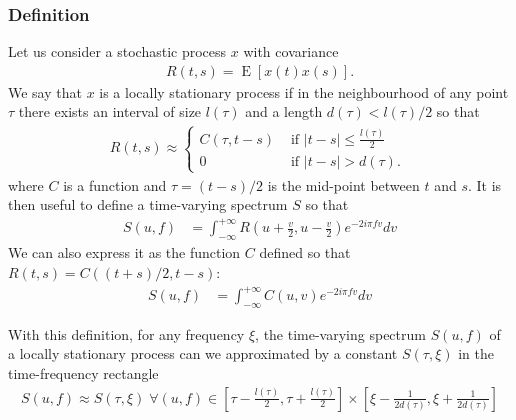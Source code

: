\documentclass{article}
\begin{document}
\subsubsection{Definition}
Let us consider a stochastic process $x$ with covariance 
\begin{eqnarray}
    R(t, s) = \operatorname{E}\left[x(t) x(s)\right].
\end{eqnarray}
We say that $x$ is a locally stationary process if in the neighbourhood of any point $\tau$ there exists an interval of size $l(\tau)$ and a length $d(\tau) < l(\tau)/2$ so that
\begin{align}
\label{eq:locally-stationary}
R(t, s)  \approx \left\{
\begin{array}{lr}
C(\tau, t-s) & \text { if }|t-s| \leq \frac{l(\tau)}{2}\\
0 & \text { if }|t-s| > d(\tau).
\end{array}\right.\;
\end{align}
where $C$ is a function and $\tau = (t-s) / 2$ is the mid-point between $t$ and $s$.
It is then useful to define a time-varying spectrum $S$ so that
\begin{align}
\label{eq:def-evolutionary-spectrum}
S(u, f) & = \int_{-\infty}^{+\infty} R\left(u+\frac{v}{2}, u-\frac{v}{2}\right) e^{-2 i \pi f  v} d v
\end{align}
We can also express it as the function $C$ defined so that $R(t, s) = C((t+s)/2, t-s)$:
\begin{align}
\label{eq:def-evolutionary-spectrum-2}
S(u, f) & = \int_{-\infty}^{+\infty} C(u, v) e^{-2 i \pi f  v} d v
\end{align}


With this definition, for any frequency $\xi$, the time-varying spectrum $S(u, f)$ of a locally stationary process can we approximated by a constant $S(\tau, \xi)$ in the time-frequency rectangle
\begin{eqnarray}
\label{eq:constant_spectrum_approx}
S(u, f) \approx S(\tau, \xi) \; \forall 
   (u, f) \in\left[\tau-\frac{l(\tau)}{2}, \tau+\frac{l(\tau)}{2}\right] \times\left[\xi-\frac{1}{2 d(\tau)}, \xi+\frac{1}{2 d(\tau)}\right] 
\end{eqnarray}
\end{document}
